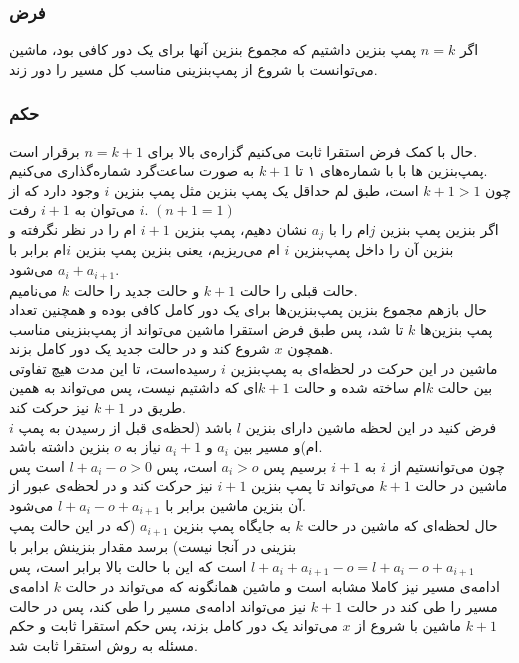 \documentclass[12pt,a4paper]{article}
\begin{document}
\subsubsection*{فرض}
اگر 
$n=k$
 پمپ بنزین داشتیم که مجموع بنزین آنها برای یک دور کافی بود، ماشین می‌توانست با شروع از پمپ‌بنزینی مناسب کل مسیر را دور زند.
\subsubsection*{حکم}
حال با کمک فرض استقرا ثابت می‌کنیم گزاره‌ی بالا برای
$n=k+1$
برقرار است.
\\
پمپ‌بنزین ها با با شماره‌های ۱ تا $k+1$ به صورت ساعت‌گرد شماره‌گذاری می‌کنیم.
\\
چون $k+1 > 1$ است، طبق لم حداقل یک پمپ بنزین مثل پمپ بنزین $i$ وجود دارد که از $i$ می‌توان به $i+1$ رفت. 
$(n+1 = 1)$
\\
اگر بنزین پمپ بنزین $j$ام را با $a_j$ نشان دهیم، پمپ بنزین $i+1$ ام را در نظر نگرفته و بنزین آن را داخل پمپ‌بنزین $i$ ام می‌ریزیم، یعنی بنزین پمپ بنزین $i$ام برابر با $a_i + a_{i+1}$ می‌شود.
\\
حالت قبلی را حالت $k+1$ و حالت جدید را حالت $k$ می‌نامیم.
\\
حال بازهم مجموع بنزین پمپ‌بنزین‌ها برای یک دور کامل کافی بوده و همچنین تعداد پمپ بنزین‌ها $k$ تا شد، پس طبق فرض استقرا ماشین می‌تواند از پمپ‌بنزینی مناسب همچون $x$ شروع کند و در حالت جدید یک دور کامل بزند.
\\
ماشین در این حرکت در لحظه‌ای به پمپ‌بنزین $i$ رسیده‌است، تا این مدت هیچ تفاوتی بین حالت $k$ام ساخته شده و حالت $k+1$ای که داشتیم نیست، پس می‌تواند به همین طریق در $k+1$ نیز حرکت کند.\\
فرض کنید در این لحظه ماشین دارای بنزین $l$ باشد  (لحظه‌ی قبل از رسیدن به پمپ $i$ام)و مسیر بین $a_i$ و $a_i+1$ نیاز به $o$ بنزین داشته باشد.
\\
چون می‌توانستیم از $i$ به $i+1$ برسیم پس $a_i > o$ است، پس $l+a_i - o > 0$ است پس ماشین در حالت $k+1$ می‌تواند تا پمپ بنزین $i+1$ نیز حرکت کند و در لحظه‌ی عبور از آن بنزین ماشین برابر با 
$l+a_i - o + a_{i+1}$
می‌شود.\\
حال لحظه‌ای که ماشین در حالت $k$ به جایگاه پمپ بنزین $a_{i+1}$ (که در این حالت پمپ بنزینی در آنجا نیست) برسد مقدار بنزینش برابر با 
$l+ a_i + a_{i+1} - o = l + a_i - o + a_{i+1}$
است که این با حالت بالا برابر است، پس ادامه‌ی مسیر نیز کاملا مشابه است و ماشین همانگونه که می‌تواند در حالت $k$ ادامه‌ی مسیر را طی کند در حالت $k+1$ نیز می‌تواند ادامه‌ی مسیر را طی کند، پس  در حالت $k+1$  ماشین با شروع از $x$ می‌تواند یک دور کامل بزند، پس حکم استقرا ثابت و حکم مسئله به روش استقرا ثابت شد.
\end{document}

